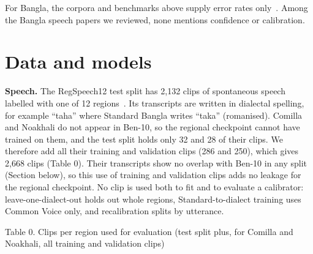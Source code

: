 \documentclass[10pt]{article}
\begin{document}
For Bangla, the corpora and benchmarks above supply error rates only~\cite{Dipto2025,Hassan2025,Hasan2025}. Among the Bangla speech papers we reviewed, none mentions confidence or calibration.


\section{Data and models}

\textbf{Speech.} The RegSpeech12 test split has 2,132 clips of spontaneous speech labelled with one of 12 regions~\cite{Hassan2025}. Its transcripts are written in dialectal spelling, for example ``taha'' where Standard Bangla writes ``taka'' (romanised). Comilla and Noakhali do not appear in Ben-10, so the regional checkpoint cannot have trained on them, and the test split holds only 32 and 28 of their clips. We therefore add all their training and validation clips (286 and 250), which gives 2,668 clips (Table 0). Their transcripts show no overlap with Ben-10 in any split (Section below), so this use of training and validation clips adds no leakage for the regional checkpoint. No clip is used both to fit and to evaluate a calibrator: leave-one-dialect-out holds out whole regions, Standard-to-dialect training uses Common Voice only, and recalibration splits by utterance.


\begin{table}[htb]
\centering
\par\noindent\begin{minipage}{\linewidth}\small Table 0. Clips per region used for evaluation (test split plus, for Comilla and Noakhali, all training and validation clips)\end{minipage}\par\smallskip
\small
{}
\end{table}
\end{document}
